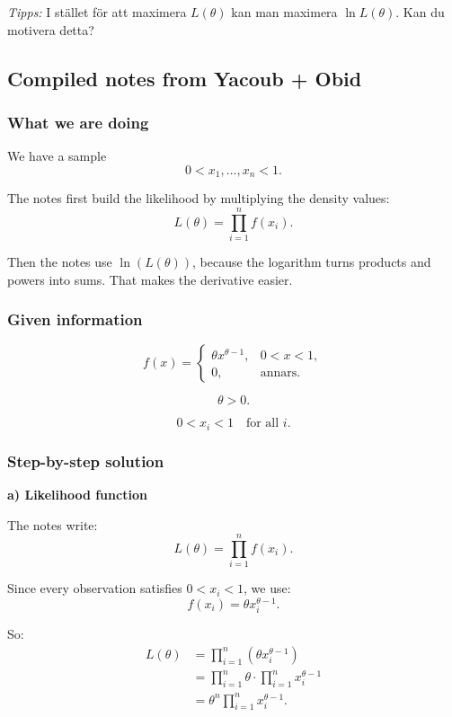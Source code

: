 \documentclass[10pt]{article}
\begin{document}
\textit{Tipps:} I stället för att maximera
\(L(\theta)\) kan man maximera \(\ln L(\theta)\).
Kan du motivera detta?

\subsection*{Compiled notes from Yacoub + Obid}

\subsubsection*{What we are doing}

We have a sample
\[
0<x_1,\ldots,x_n<1.
\]

The notes first build the likelihood by multiplying
the density values:
\[
L(\theta)=\prod_{i=1}^{n} f(x_i).
\]

Then the notes use \(\ln(L(\theta))\), because the
logarithm turns products and powers into sums.
That makes the derivative easier.

\subsubsection*{Given information}

\[
f(x)=
\begin{cases}
\theta x^{\theta-1},
& 0<x<1,\\
0,
& \text{annars}.
\end{cases}
\]

\[
\theta>0.
\]

\[
0<x_i<1
\quad
\text{for all }i.
\]

\subsubsection*{Step-by-step solution}

\textbf{a) Likelihood function}

The notes write:
\[
L(\theta)
=
\prod_{i=1}^{n} f(x_i).
\]

Since every observation satisfies \(0<x_i<1\),
we use:
\[
f(x_i)=\theta x_i^{\theta-1}.
\]

So:
\begin{align*}
L(\theta)
&=
\prod_{i=1}^{n}
\left(
\theta x_i^{\theta-1}
\right)
\\[2mm]
&=
\prod_{i=1}^{n}\theta
\cdot
\prod_{i=1}^{n}
x_i^{\theta-1}
\\[2mm]
&=
\theta^n
\prod_{i=1}^{n}
x_i^{\theta-1}.
\end{align*}
\end{document}
